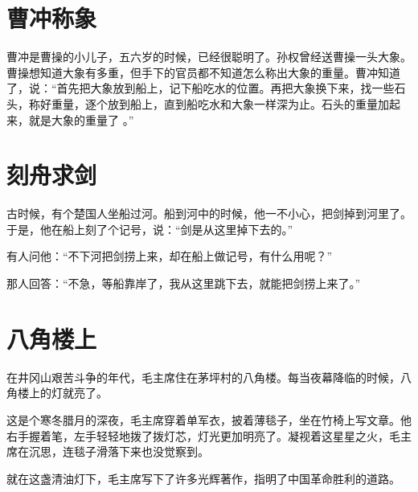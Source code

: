 \documentclass[12pt,UTF-8,openany]{ctexbook}
\begin{document}
\chapter{曹冲称象}

\begin{large}
    
    曹冲是曹操的小儿子，五六岁的时候，已经很聪明了。孙权曾经送曹操一头大象。曹操想知道大象有多重，但手下的官员都不知道怎么称出大象的重量。曹冲知道了，说：“首先把大象放到船上，记下船吃水的位置。再把大象换下来，找一些石头，称好重量，逐个放到船上，直到船吃水和大象一样深为止。石头的重量加起来，就是大象的重量了  。”
    
\end{large}



\chapter{刻舟求剑}

\begin{large}
    
    古时候，有个楚国人坐船过河。船到河中的时候，他一不小心，把剑掉到河里了。于是，他在船上刻了个记号，说：“剑是从这里掉下去的。”
    
    有人问他：“不下河把剑捞上来，却在船上做记号，有什么用呢？”
    
    那人回答：“不急，等船靠岸了，我从这里跳下去，就能把剑捞上来了。”
    
\end{large}



\chapter{八角楼上}

\begin{large}
    
    在井冈山艰苦斗争的年代，毛主席住在茅坪村的八角楼。每当夜幕降临的时候，八角楼上的灯就亮了。
    
    这是个寒冬腊月的深夜，毛主席穿着单军衣，披着薄毯子，坐在竹椅上写文章。他右手握着笔，左手轻轻地拨了拨灯芯，灯光更加明亮了。凝视着这星星之火，毛主席在沉思，连毯子滑落下来也没觉察到。
    
    就在这盏清油灯下，毛主席写下了许多光辉著作，指明了中国革命胜利的道路。
    
\end{large}
\end{document}
